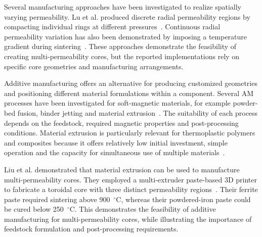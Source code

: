Several manufacturing approaches have been investigated to realize spatially varying permeability. Lu et al. produced discrete radial permeability regions by compacting individual rings at different pressures~\cite{luDesignPreparationLowtemperature2026}. Continuous radial permeability variation has also been demonstrated by imposing a temperature gradient during sintering~\cite{liuContinuouslyVariableMultiPermeability2020}. These approaches demonstrate the feasibility of creating multi-permeability cores, but the reported implementations rely on specific core geometries and manufacturing arrangements.

Additive manufacturing offers an alternative for producing customized geometries and positioning different material formulations within a component. Several AM processes have been investigated for soft-magnetic materials, for example powder-bed fusion, binder jetting and material extrusion~\cite{wang3DPrintingSoft2024,weiAdvances3DPrinting2022}. The suitability of each process depends on the feedstock, required magnetic properties and post-processing conditions. Material extrusion is particularly relevant for thermoplastic polymers and composites because it offers relatively low initial investment, simple operation and the capacity for simultaneous use of multiple materials~\cite{sadafAdvancementsMetalAdditive2024}.

Liu et al. demonstrated that material extrusion can be used to manufacture multi-permeability cores. They employed a multi-extruder paste-based 3D printer to fabricate a toroidal core with three distinct permeability regions~\cite{liuDesignAdditiveManufacturing2018}. Their ferrite paste required sintering above 900~$^\circ$C, whereas their powdered-iron paste could be cured below 250~$^\circ$C. This demonstrates the feasibility of additive manufacturing for multi-permeability cores, while illustrating the importance of feedstock formulation and post-processing requirements.

